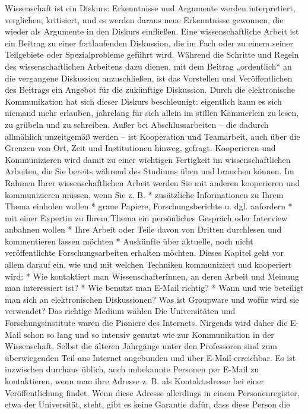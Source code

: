 \documentclass[]{book}
\theoremstyle{definition}
\theoremstyle{definition}
\theoremstyle{definition}
\theoremstyle{remark}
\begin{document}
Wissenschaft ist ein Diskurs: Erkenntnisse und Argumente werden
interpretiert, verglichen, kritisiert, und es werden daraus neue
Erkenntnisse gewonnen, die wieder als Argumente in den Diskurs
einfließen. Eine wissenschaftliche Arbeit ist ein Beitrag zu einer
fortlaufenden Diskussion, die im Fach oder zu einem seiner Teilgebiete
oder Spezialprobleme geführt wird. Während die Schritte und Regeln des
wissenschaftlichen Arbeitens dazu dienen, mit dem Beitrag „ordentlich``
an die vergangene Diskussion anzuschließen, ist das Vorstellen und
Veröffentlichen des Beitrags ein Angebot für die zukünftige Diskussion.
Durch die elektronische Kommunikation hat sich dieser Diskurs
beschleunigt: eigentlich kann es sich niemand mehr erlauben, jahrelang
für sich allein im stillen Kämmerlein zu lesen, zu grübeln und zu
schreiben. Außer bei Abschlussarbeiten -- die dadurch allmählich
unzeitgemäß werden -- ist Kooperation und Teamarbeit, auch über die
Grenzen von Ort, Zeit und Institutionen hinweg, gefragt. Kooperieren und
Kommunizieren wird damit zu einer wichtigen Fertigkeit im
wissenschaftlichen Arbeiten, die Sie bereits während des Studiums üben
und brauchen können. Im Rahmen Ihrer wissenschaftlichen Arbeit werden
Sie mit anderen kooperieren und kommunizieren müssen, wenn Sie z. B. *
zusätzliche Informationen zu Ihrem Thema einholen wollen * graue
Papiere, Forschungsberichte u. dgl. anfordern * mit einer Expertin zu
Ihrem Thema ein persönliches Gespräch oder Interview anbahnen wollen *
Ihre Arbeit oder Teile davon von Dritten durchlesen und kommentieren
lassen möchten * Auskünfte über aktuelle, noch nicht veröffentlichte
Forschungsarbeiten erhalten möchten. Dieses Kapitel geht vor allem
darauf ein, wie und mit welchen Techniken kommuniziert und kooperiert
wird: * Wie kontaktiert man Wissenschafterinnen, an deren Arbeit und
Meinung man interessiert ist? * Wie benutzt man E-Mail richtig? * Wann
und wie beteiligt man sich an elektronischen Diskussionen? Was ist
Groupware und wofür wird sie verwendet? Das richtige Medium wählen Die
Universitäten und Forschungsinstitute waren die Pioniere des Internets.
Nirgends wird daher die E-Mail schon so lang und so intensiv genutzt wie
zur Kommunikation in der Wissenschaft. Selbst die älteren Jahrgänge
unter den Professoren sind zum überwiegenden Teil ans Internet
angebunden und über E-Mail erreichbar. Es ist inzwischen durchaus
üblich, auch unbekannte Personen per E-Mail zu kontaktieren, wenn man
ihre Adresse z. B. als Kontaktadresse bei einer Veröffentlichung findet.
Wenn diese Adresse allerdings in einem Personenregister, etwa der
Universität, steht, gibt es keine Garantie dafür, dass diese Person die
\end{document}
